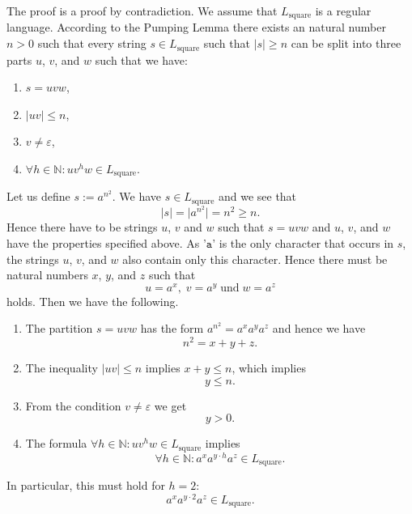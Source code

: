 \solutionEng
The proof is a proof by contradiction.  We assume that $L_{\mathrm{square}}$ is a regular language.
According to the Pumping Lemma there exists an natural number $n>0$
such that every string
$s \in L_{\mathrm{square}}$ such that $|s| \geq n$ can be split into three parts $u$, $v$, and $w$ such that we
have:
\begin{enumerate}
\item $s = uvw$,
\item $|uv| \leq n$,
\item $v \not= \varepsilon$,
\item $\forall h \in \mathbb{N}: uv^hw \in L_{\mathrm{square}}$. 
\end{enumerate} 
Let us define $s := a^{n^2}$.  We have $s \in L_{\mathrm{square}}$ and we see that
\[ |s| = \big| a^{n^2} \big| = n^2 \geq n. \]
Hence there have to be strings $u$, $v$ and $w$ such that $s = uvw$ and $u$, $v$, and $w$ have
the properties specified above.
As '$\mathtt{a}$' is the only character that occurs in $s$, the strings $u$, $v$, and $w$ also contain only this character.
Hence there must be natural numbers $x$, $y$, and $z$ such that 
\[ u = a^x,\; v = a^y\; \mbox{und}\; w = a^z \]
holds.  Then we have the following.
\begin{enumerate}
\item The partition  $s = uvw$ has the form $a^{n^2} = a^xa^ya^z$ and hence we have
      \begin{equation}
        \label{eq:e1}
         n^2 = x + y + z.     
      \end{equation}
\item The inequality $|uv| \leq n$ implies $x +y \leq n$, which implies
      \begin{equation}
        \label{eq:e2}
        y \leq n.
      \end{equation}
\item From the condition $v \not= \varepsilon$ we get
      \begin{equation}
        \label{eq:e3}
        y > 0.
      \end{equation}
\item The formula $\forall h \in \mathbb{N}: uv^hw \in L_{\mathrm{square}}$ implies
      \begin{equation}
        \label{eq:e4}
        \forall h \in \mathbb{N}: a^xa^{y\cdot h}a^z \in L_{\mathrm{square}}. 
      \end{equation}
\end{enumerate}
In particular, this must hold for $h=2$:
\[ a^xa^{y\cdot 2}a^z \in L_{\mathrm{square}}.  \]
